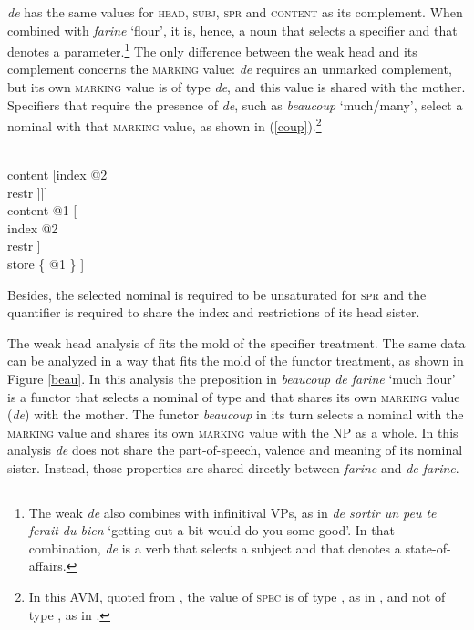 \documentclass[output=paper
                ,modfonts
                ,nonflat
	        ,collection
	        ,collectionchapter
	        ,collectiontoclongg
 	        ,biblatex
                ,babelshorthands
                ,newtxmath
                ,draftmode
                ,colorlinks, citecolor=brown
]{./langsci/langscibook}
\begin{document}
\noindent
\emph{de} has the same values for \textsc{head}, \textsc{subj}, \textsc{spr} and 
\textsc{content} as its complement. 
When combined with \emph{farine} `flour', it is, hence, a noun 
that selects a specifier and that denotes a parameter.\footnote{The 
weak \emph{de} also combines with infinitival VPs, as in \emph{de sortir un peu
te ferait du bien} `getting out a bit would do you some good'. In that 
combination, \emph{de} is a verb that selects a subject and that denotes 
a state-of-affairs.} The only difference between the weak head and its complement  
concerns the \textsc{marking} value: \emph{de} requires an unmarked complement, but 
its own \textsc{marking} value is of type \emph{de}, and this value is shared with the mother.  
Specifiers that require the presence of \emph{de}, such as \emph{beaucoup} `much/many', 
select a nominal with that \textsc{marking} value, 
as shown in (\ref{coup}).\footnote{In this AVM, quoted from \citet[18]{Abeilleetal04}, 
the value of \textsc{spec} is of type , as in \citet{ps2}, and not of type 
, as in \citet{GS00}.}  

\begin{exe} 
\ex\label{coup} 
\begin{avm} 
[cat|head [\type{adverb}                                   \\
           spec|loc [cat [head \type{noun}               \\
                          spr <X>                         \\
                          mark \type{de}]                \\
                     content [index @2                    \\
                              restr \avmbox{$\Sigma$} ]]] \\ 
 content @1 [        \\
               index @2                  \\
               restr \avmbox{$\Sigma$} ] \\
 store \{ @1 \} ]
\end{avm}
\end{exe} 

\noindent
Besides, the selected nominal is required to be unsaturated for \textsc{spr} and 
the quantifier is required to share the index and restrictions of its head sister. 

The weak head analysis of \citet{Abeilleetal04} fits the mold of the specifier treatment. 
The same data can be analyzed in a way that fits the mold of the functor treatment,
as shown in Figure \ref{beau}. 
In this analysis the preposition in \emph{beaucoup de farine} `much flour'
is a functor that selects a nominal of type  and that 
shares its own \textsc{marking} value (\emph{de}) with the mother. 
The functor \emph{beaucoup} in its turn selects a nominal with the \textsc{marking} value 
 and shares its own \textsc{marking} value with the NP as a whole. 
In this analysis \emph{de} does not share the part-of-speech, valence and 
meaning of its nominal sister. Instead, those properties are shared directly between
\emph{farine} and \emph{de farine}. 
\end{document}
